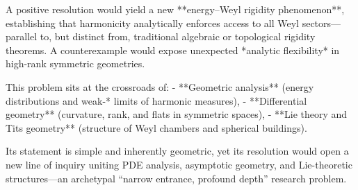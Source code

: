 A positive resolution would yield a new **energy–Weyl rigidity phenomenon**, establishing that harmonicity analytically enforces access to all Weyl sectors—parallel to, but distinct from, traditional algebraic or topological rigidity theorems. A counterexample would expose unexpected *analytic flexibility* in high-rank symmetric geometries.  

This problem sits at the crossroads of:
- **Geometric analysis** (energy distributions and weak-* limits of harmonic measures),
- **Differential geometry** (curvature, rank, and flats in symmetric spaces),
- **Lie theory and Tits geometry** (structure of Weyl chambers and spherical buildings).

Its statement is simple and inherently geometric, yet its resolution would open a new line of inquiry uniting PDE analysis, asymptotic geometry, and Lie-theoretic structures—an archetypal “narrow entrance, profound depth” research problem.